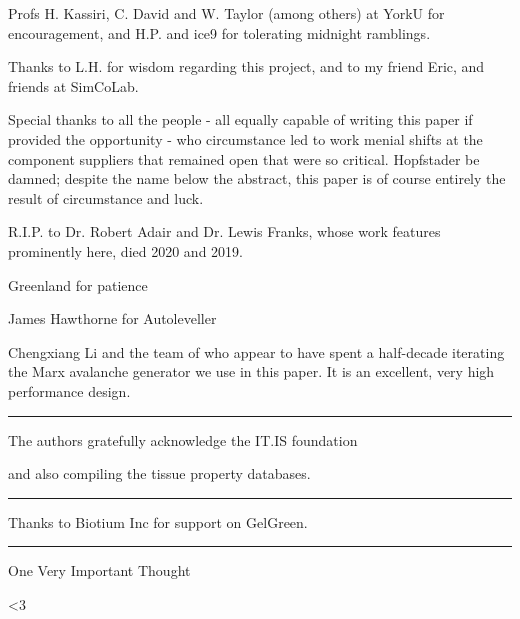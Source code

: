 \documentclass[paper.tex]{subfiles}
\begin{document}
Profs H. Kassiri, C. David and W. Taylor (among others) at YorkU for encouragement, and H.P. and ice9 for tolerating midnight ramblings.

Thanks to L.H. for wisdom regarding this project, and to my friend Eric, and friends at SimCoLab.

Special thanks to all the people - all equally capable of writing this paper if provided the opportunity - who circumstance led to work menial shifts at the component suppliers that remained open that were so critical. Hopfstader be damned; despite the name below the abstract, this paper is of course entirely the result of circumstance and luck. 

R.I.P. to Dr. Robert Adair and Dr. Lewis Franks, whose work features prominently here, died 2020 and 2019.

Greenland for patience

James Hawthorne for Autoleveller


Chengxiang Li and the team of who appear to have spent a half-decade iterating the Marx avalanche generator we use in this paper. It is an excellent, very high performance design.



\rule{\linewidth}{0.2pt}

The authors gratefully acknowledge the IT.IS foundation 

and also compiling the tissue property databases.


\rule{\linewidth}{0.2pt}

Thanks to Biotium Inc for support on GelGreen.

\rule{\linewidth}{0.2pt}

One Very Important Thought


{\Large {\verbatim <3}}
\end{document}
